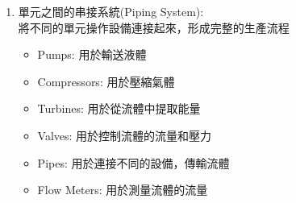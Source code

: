 \documentclass[../main.tex]{subfiles}
\begin{document}
\begin{itemize}
\begin{enumerate}
\begin{itemize}
\begin{itemize}
          使用蒸餾(Distillation)器(Distiller)
      \end{itemize}
      \item 溶解度差異
      \begin{itemize}
        \item 氣體，以液體捕捉\\
          使用吸收(Absorb)塔(Absorption Tower)
        \item 液體，以氣體捕捉\\
          使用洗滌(Stripping)塔(Stripping Tower)
        \item 由一種液體，轉移到另一種液體\\
          使用萃取(Extract)器(Extractor)
        \item 由固體，轉移到液體\\
          使用浸出(Leaching)器(Leacher)
      \end{itemize}
      \item 將水從成分中移除或加入:
      \begin{itemize}
        \item 使用乾燥(Drying)器(Dryer)將水分從固體中移除
        \item 使用增濕(Humidifying)器(Humidifier)將水分加入氣體中
        \item 使用除溼(Dehumidifying)器(Dehumidifier)將水分從氣體中移除
      \end{itemize}
      \item 固體與固體以密度差分離:
      \begin{itemize}
        \item 使用篩分(Screening)器(Screen)將不同粒徑的固體分離
        \item 使用沉降(Settling)器(Settler)將密度不同的固體分離
      \end{itemize}
    \end{itemize}
    \item 單元之間的串接系統(Piping System): \\
    將不同的單元操作設備連接起來，形成完整的生產流程
    \begin{itemize}
      \item Pumps: 用於輸送液體
      \item Compressors: 用於壓縮氣體
      \item Turbines: 用於從流體中提取能量
      \item Valves: 用於控制流體的流量和壓力
      \item Pipes: 用於連接不同的設備，傳輸流體
      \item Flow Meters: 用於測量流體的流量

\end{itemize}
\end{enumerate}
\end{itemize}
\end{document}
